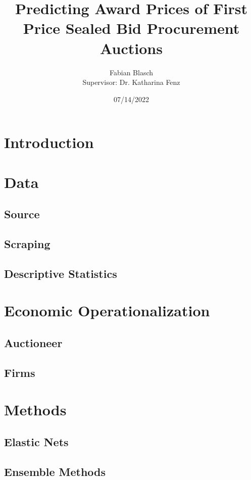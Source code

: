 \documentclass[a4paper,12pt, headsepline]{scrartcl}
\title{Predicting Award Prices of First Price Sealed Bid Procurement Auctions}
\date{07/14/2022}
\author{Fabian Blasch\\[0.4cm]{Supervisor: Dr. Katharina Fenz}}
\numberwithin{equation}{section}
\begin{document}
\begin{titlingpage}
\maketitle
\end{titlingpage}
\newpage
\tableofcontents
\newpage
\section{Introduction}\label{sec:int}

\section{Data}\label{sec:data}
	\subsection{Source}\label{subsec:sour}
	\subsection{Scraping}\label{subsec:scrap}
	\subsection{Descriptive Statistics}\label{subsec:desc}
\section{Economic Operationalization}\label{sec:op}
	\subsection{Auctioneer}\label{subsec:auc}
	\subsection{Firms}\label{subsec:firms}

\section{Methods}\label{sec:meth}
	\subsection{Elastic Nets}\label{subsec:net}
	\subsection{Ensemble Methods}\label{subsec:ens}
\end{document}
